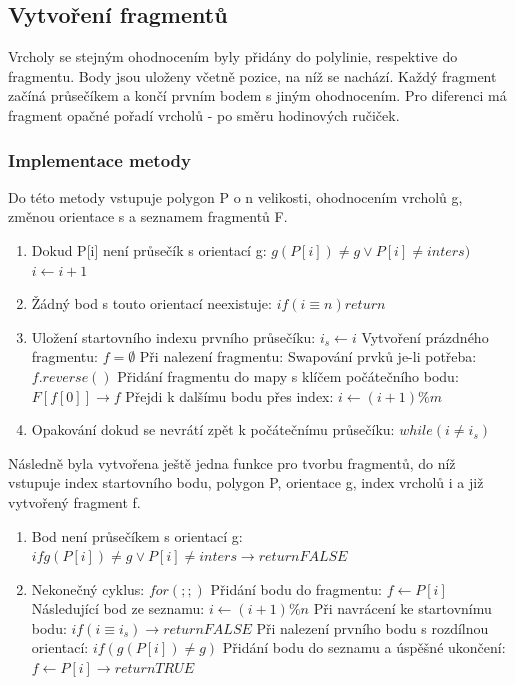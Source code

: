 \documentclass[a4paper, 12pt]{article}
\begin{document}
\subsection{Vytvoření fragmentů}
Vrcholy se stejným ohodnocením byly přidány do polylinie, respektive do fragmentu. Body jsou uloženy včetně pozice, na níž se nachází. Každý fragment začíná průsečíkem a končí prvním bodem s jiným ohodnocením. Pro diferenci má fragment opačné pořadí vrcholů - po směru hodinových ručiček. 

\subsubsection{Implementace metody}
Do této metody vstupuje polygon P o n velikosti, ohodnocením vrcholů g, změnou orientace s a seznamem fragmentů F. 

\begin{enumerate}
\item Dokud P[i] není průsečík s orientací g: $g(P[i]) \neq g \vee P[i] \neq inters )$
\subitem $i \leftarrow i + 1 $
\item Žádný bod s touto orientací neexistuje: $if (i \equiv n) return$
\item Uložení startovního indexu prvního průsečíku: $i_s \leftarrow i$
\subitem Vytvoření prázdného fragmentu: $f = \emptyset $
\subitem Při nalezení fragmentu: 
\subitem Swapování prvků je-li potřeba: $f.reverse()$
\subitem Přidání fragmentu do mapy s klíčem počátečního bodu: $F[f[0]] \rightarrow f$
\subitem Přejdi k dalšímu bodu přes index: $i \leftarrow (i+1)\% m$
\item Opakování dokud se nevrátí zpět k počátečnímu průsečíku: $ while (i \neq i_s)$
\end{enumerate}

Následně byla vytvořena ještě jedna funkce pro tvorbu fragmentů, do níž vstupuje index startovního bodu, polygon P, orientace g, index vrcholů i a již vytvořený fragment f.

\begin{enumerate}
\item Bod není průsečíkem s orientací g: $if g(P[i]) \neq g \vee P[i] \neq inters \rightarrow return FALSE$
\item Nekonečný cyklus: $for (;;)$
\subitem Přidání bodu do fragmentu: $f \leftarrow P[i]$
\subitem Následující bod ze seznamu: $i \leftarrow (i+1)\%n$
\subitem Při navrácení ke startovnímu bodu: $if (i \equiv i_s) \rightarrow return FALSE$
\subitem Při nalezení prvního bodu s rozdílnou orientací: $if (g(P[i]) \neq g)$
\subitem Přidání bodu do seznamu a úspěšné ukončení: $f \leftarrow P[i] \rightarrow return TRUE$
\end{enumerate}
\end{document}
